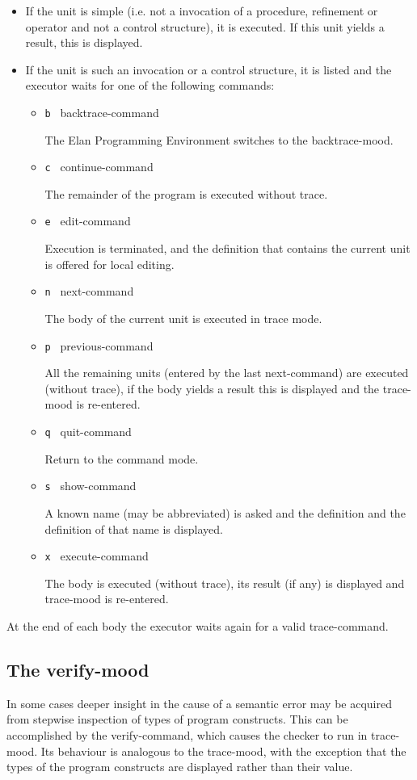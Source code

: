 \begin{itemize}
\item	If the unit is simple (i.e. not a invocation of a procedure,
	refinement or operator and not a control structure), it is
	executed. If this unit yields a result, this is displayed.
\item	If the unit is such an invocation or a control structure, it is
	listed and the executor waits for one of the following commands:

	\begin{itemize}
	\item{\tt b } backtrace-command

	The Elan Programming Environment switches to the backtrace-mood.
	\item{\tt c } continue-command

	The remainder of the program is executed without trace.
	\item{\tt e } edit-command

	Execution is terminated, and the definition that contains
	the current unit is offered for local editing.
	\item{\tt n } next-command

	The body of the current unit is executed in trace mode.
	\item{\tt p } previous-command

	All the remaining units (entered by the last next-command)
	are executed (without trace), if the body yields a result
	this is displayed and the trace-mood is re-entered.
	\item{\tt q } quit-command

	Return to the command mode.
	\item{\tt s } show-command

	A known name (may be abbreviated) is asked and the definition
	and the definition of that name is displayed.
	\item{\tt x } execute-command

	The body is executed (without trace), its result (if any)
	is displayed and trace-mood is re-entered.
	\end{itemize}
\end{itemize}

\noindent
At the end of each body the executor waits again for a valid
trace-command.

\subsection{The verify-mood}

In some cases deeper insight in the cause of a semantic error may be
acquired from stepwise inspection of types of program constructs. This
can be accomplished by the verify-command, which causes the checker to
run in trace-mood. Its behaviour is analogous to the trace-mood, with
the exception that the types of the program constructs are displayed
rather than their value.


